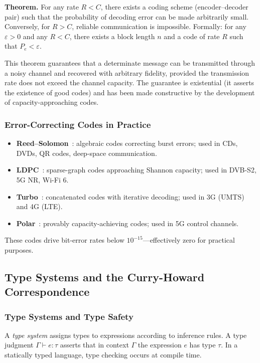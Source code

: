 \documentclass[a4paper,twocolumn,11pt]{article}
\begin{document}
\textbf{Theorem.} For any rate $R < C$, there exists a coding scheme (encoder--decoder pair) such that the probability of decoding error can be made arbitrarily small. Conversely, for $R > C$, reliable communication is impossible. Formally: for any $\varepsilon > 0$ and any $R < C$, there exists a block length $n$ and a code of rate $R$ such that $P_e < \varepsilon$.

This theorem guarantees that a determinate message can be transmitted through a noisy channel and recovered with arbitrary fidelity, provided the transmission rate does not exceed the channel capacity. The guarantee is existential (it asserts the existence of good codes) and has been made constructive by the development of capacity-approaching codes.

\subsubsection*{Error-Correcting Codes in Practice}

\begin{itemize}[noitemsep]
\item \textbf{Reed--Solomon}~\cite{ReedSolomon1960}: algebraic codes correcting burst errors; used in CDs, DVDs, QR codes, deep-space communication.
\item \textbf{LDPC}~\cite{Gallager1962,MacKay1999}: sparse-graph codes approaching Shannon capacity; used in DVB-S2, 5G NR, Wi-Fi 6.
\item \textbf{Turbo}~\cite{Berrou1993}: concatenated codes with iterative decoding; used in 3G (UMTS) and 4G (LTE).
\item \textbf{Polar}~\cite{Arikan2009}: provably capacity-achieving codes; used in 5G control channels.
\end{itemize}

These codes drive bit-error rates below $10^{-15}$---effectively zero for practical purposes.

\subsection{Type Systems and the Curry-Howard Correspondence}
\label{sec:A7}

\subsubsection*{Type Systems and Type Safety}

A \emph{type system} assigns types to expressions according to inference rules. A type judgment $\Gamma \vdash e : \tau$ asserts that in context $\Gamma$ the expression $e$ has type $\tau$. In a statically typed language, type checking occurs at compile time.
\end{document}
